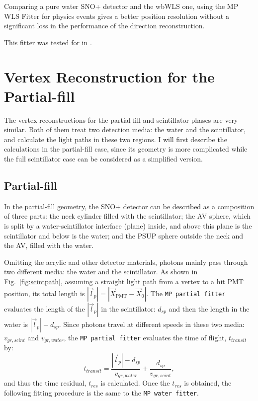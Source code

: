 Comparing a pure water SNO+ detector and the wbWLS one, using the MP WLS Fitter for physics events gives a better position resolution without a significant loss in the performance of the direction reconstruction.

This fitter was tested for in \cite{mekarski2018electron}.

\section{Vertex Reconstruction for the Partial-fill}\label{sect:partialFitter}
The vertex reconstructions for the partial-fill and scintillator phases are very similar. Both of them treat two detection media: the water and the scintillator, and calculate the light paths in these two regions. I will first describe the calculations in the partial-fill case, since its geometry is more complicated while the full scintillator case can be considered as a simplified version.

\subsection{Partial-fill}

In the partial-fill geometry, the SNO+ detector can be described as a composition of three parts: the neck cylinder filled with the scintillator; the AV sphere, which is split by a water-scintillator interface (plane) inside, and above this plane is the scintillator and below is the water; and the PSUP sphere outside the neck and the AV, filled with the water.

Omitting the acrylic and other detector materials, photons mainly pass through two different media: the water and the scintillator. As shown in Fig.~\ref{fig:scintpath}, assuming a straight light path from a vertex to a hit PMT position, its total length is $|\vec{l}_p|=|\vec{X}_\mathrm{PMT}-\vec{X}_0|$. The \texttt{MP partial fitter} evaluates the length of the $|\vec{l}_p|$ in the scintillator: $d_{sp}$ and then the length in the water is $|\vec{l}_p|-d_{sp}$. Since photons travel at different speeds in these two media: $v_{gr,scint}$ and $v_{gr,water}$, the \texttt{MP partial fitter} evaluates the time of flight, $t_{transit}$ by:
\begin{equation}
t_{transit} = \frac{|\vec{l}_p|-d_{sp}}{v_{gr,water}} +\frac{d_{sp}}{v_{gr,scint}},
\end{equation}
and thus the time residual, $t_{res}$ is calculated. Once the $t_{res}$ is obtained, the following fitting procedure is the same to the \texttt{MP water fitter}.

